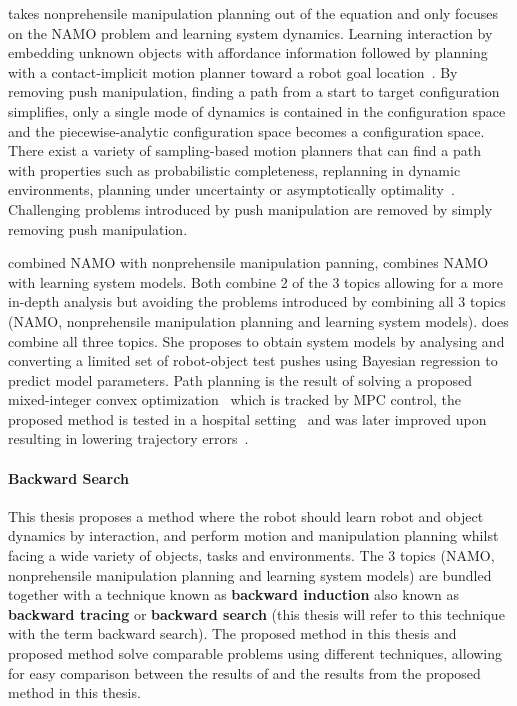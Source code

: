 \citeauthor{wang_affordancebased_2020} takes nonprehensile manipulation planning out of the equation and only focuses on the \ac{NAMO} problem and learning system dynamics. Learning interaction by embedding unknown objects with affordance information followed by planning with a contact-implicit motion planner toward a robot goal location~\cite{wang_affordancebased_2020}. By removing push manipulation, finding a path from a start to target configuration simplifies, only a single mode of dynamics is contained in the configuration space and the piecewise-analytic configuration space becomes a configuration space. There exist a variety of sampling-based motion planners that can find a path with properties such as probabilistic completeness, replanning in dynamic environments, planning under uncertainty or asymptotically optimality~\cite{karaman_samplingbased_2011,elbanhawi_samplingbased_2014}. Challenging problems introduced by push manipulation are removed by simply removing push manipulation.\bs


\citeauthor{vega-brown_asymptotically_2020} combined \ac{NAMO} with nonprehensile manipulation panning, \citeauthor{wang_affordancebased_2020} combines \ac{NAMO} with learning system models. Both combine 2 of the 3 topics allowing for a more in-depth analysis but avoiding the problems introduced by combining all 3 topics (\ac{NAMO}, nonprehensile manipulation planning and learning system models). \citeauthor{sabbaghnovin_model_2021} does combine all three topics. She proposes to obtain system models by analysing and converting a limited set of robot-object test pushes using Bayesian regression to predict model parameters. Path planning is the result of solving a proposed mixed-integer convex optimization~\cite{sabbaghnovin_optimal_2016} which is tracked by \ac{MPC} control, the proposed method is tested in a hospital setting~\cite{novin_dynamic_2018} and was later improved upon resulting in lowering trajectory errors~\cite{sabbaghnovin_model_2021}.\bs

\paragraph{Backward Search}
This thesis proposes a method where the robot should learn robot and object dynamics by interaction, and perform motion and manipulation planning whilst facing a wide variety of objects, tasks and environments. The 3 topics (\ac{NAMO}, nonprehensile manipulation planning and learning system models) are bundled together with a technique known as \textbf{backward induction} also known as \textbf{backward tracing} or \textbf{backward search} (this thesis will refer to this technique with the term backward search). The proposed method in this thesis and \citeauthor{sabbaghnovin_model_2021} proposed method solve comparable problems using different techniques, allowing for easy comparison between the results of \citeauthor{sabbaghnovin_model_2021} and the results from the proposed method in this thesis.\bs
{}

